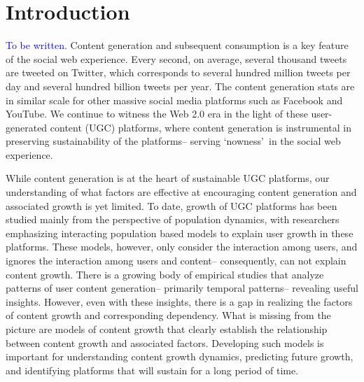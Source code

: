 \section{Introduction}
\textcolor{blue}{To be written.}
Content generation and subsequent consumption is a key feature of the social web experience. Every second, on average, several thousand tweets are tweeted on Twitter, which corresponds to several hundred million tweets per day and several hundred billion tweets per year. The content generation stats are in similar scale for other massive social media platforms such as Facebook and YouTube. We continue to witness the Web 2.0 era in the light of these user-generated content (UGC) platforms, where content generation is instrumental in preserving sustainability of the platforms-- serving \lq nowness\rq\ in the social web experience. 

While content generation is at the heart of sustainable UGC platforms, our understanding of what factors are effective at encouraging content generation and associated growth is yet limited. To date, growth of UGC platforms has been studied mainly from the perspective of population dynamics, with researchers emphasizing interacting population based models to explain user growth in these platforms. These models, however, only consider the interaction among users, and ignores the interaction among users and content-- consequently, can not explain content growth. There is a growing body of empirical studies that analyze patterns of user content generation-- primarily temporal patterns-- revealing useful insights. However, even with these insights, there is a gap in realizing the factors of content growth and corresponding dependency. What is missing from the picture are models of content growth that clearly establish the relationship between content growth and associated factors. Developing such models is important for understanding content growth dynamics, predicting future growth, and identifying platforms that will sustain for a long period of time.